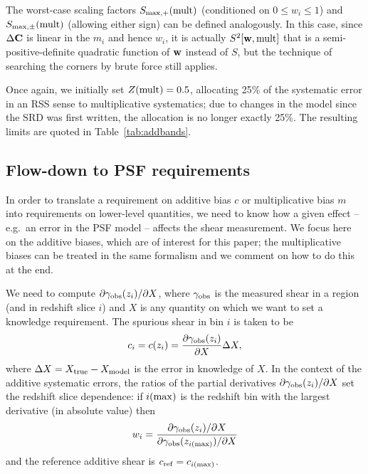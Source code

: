 \documentclass[usenatbib]{mnras}
\begin{document}
The worst-case scaling factors $S_{\rm max,+}({\rm mult})$ (conditioned on $0\le w_i\le 1$) and $S_{\rm max,\pm}({\rm mult})$ (allowing either sign) can be defined analogously. In this case, since $\Delta{\bf C}$ is linear in the $m_i$ and hence $w_i$, it is actually $S^2[{\bf w},{\rm mult}]$ that is a semi-positive-definite quadratic function of ${\bf w}$ instead of $S$, but the technique of searching the corners by brute force still applies.

Once again, we initially set $Z({\rm mult})=0.5$, allocating 25\% of the systematic error in an RSS sense to multiplicative systematics; due to changes in the model since the SRD was first written, the allocation is no longer exactly 25\%. The resulting limits are quoted in Table~\ref{tab:addbands}.

\subsection{Flow-down to PSF requirements}

In order to translate a requirement on additive bias $c$ or multiplicative bias $m$ into requirements on lower-level quantities, we need to know how a given effect -- e.g.\ an error in the PSF model -- affects the shear measurement. We focus here on the additive biases, which are of interest for this paper; the multiplicative biases can be treated in the same formalism and we comment on how to do this at the end.

We need to compute $\partial\gamma_{\rm obs}(z_i)/\partial X$, where $\gamma_{\rm obs}$ is the measured shear in a region (and in redshift slice $i$) and $X$ is any quantity on which we want to set a knowledge requirement. The spurious shear in bin $i$ is taken to be
\begin{equation}
c_i = c(z_i) = \frac{\partial\gamma_{\rm obs}(z_i)}{\partial X} \Delta X,
\label{eq:X-shape}
\end{equation}
where $\Delta X = X_{\rm true} - X_{\rm model}$ is the error in
knowledge of $X$. In the context of the additive systematic errors,
the ratios of the partial derivatives $\partial\gamma_{\rm
obs}(z_i)/\partial X$ set the redshift slice dependence: if $i({\rm
max})$ is the redshift bin with the largest derivative (in absolute
value) then
\begin{equation}
w_i = \frac{\partial\gamma_{\rm obs}(z_i)/\partial X}{\partial\gamma_{\rm obs}(z_{i({\rm max})})/\partial X}
\end{equation}
and the reference additive shear is $c_{\rm ref} = c_{i({\rm max})}$.
\end{document}
